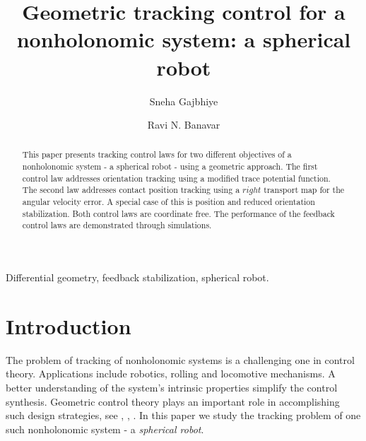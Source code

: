 \documentclass{ifacconf}
\begin{document}
\begin{frontmatter}

\title{Geometric tracking control for a nonholonomic system: a spherical robot} 




\author[First]{Sneha Gajbhiye} 
\author[First]{Ravi N. Banavar} 


\address[First]{Systems and Control Engineering, Indian Institute of Technology Bombay,
India, 400076. (e-mail: sneha@sc.iitb.ac.in, banavar@iitb.ac.in)}


\begin{abstract}  This paper presents tracking control laws for two different objectives of a nonholonomic system - a spherical robot - using a geometric approach. The first control law addresses orientation tracking using a modified trace potential function. The second law addresses contact position tracking using a $right$ transport map for the angular velocity error. A special case of this is position and reduced orientation stabilization. Both control laws are coordinate free. The performance of the feedback control laws are demonstrated through simulations.

\end{abstract}

\begin{keyword}
Differential geometry, feedback stabilization, spherical robot.
\end{keyword}

\end{frontmatter}


\section{Introduction}
The problem of tracking of nonholonomic systems is a challenging one in control theory. Applications include robotics, rolling and locomotive mechanisms. A better understanding of  the system's intrinsic properties simplify the control synthesis. Geometric control theory plays an important role in accomplishing such design strategies, see \citep{book_isidori}, \citep{Zenkov}, \citep{ostrowski_thesis}. In this paper we study the tracking problem of one such nonholonomic system - a \textit{spherical robot}.
\end{document}
